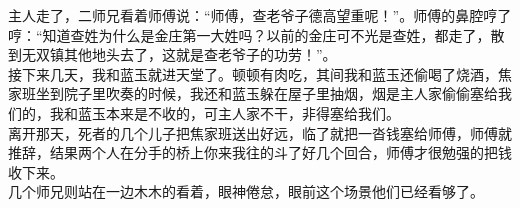 主人走了，二师兄看着师傅说：“师傅，查老爷子德高望重呢！”。师傅的鼻腔哼了哼：“知道查姓为什么是金庄第一大姓吗？以前的金庄可不光是查姓，都走了，散到无双镇其他地头去了，这就是查老爷子的功劳！”。
\\

接下来几天，我和蓝玉就进天堂了。顿顿有肉吃，其间我和蓝玉还偷喝了烧酒，焦家班坐到院子里吹奏的时候，我还和蓝玉躲在屋子里抽烟，烟是主人家偷偷塞给我们的，我和蓝玉本来是不收的，可主人家不干，非得塞给我们。
\\

离开那天，死者的几个儿子把焦家班送出好远，临了就把一沓钱塞给师傅，师傅就推辞，结果两个人在分手的桥上你来我往的斗了好几个回合，师傅才很勉强的把钱收下来。
\\

几个师兄则站在一边木木的看着，眼神倦怠，眼前这个场景他们已经看够了。\\